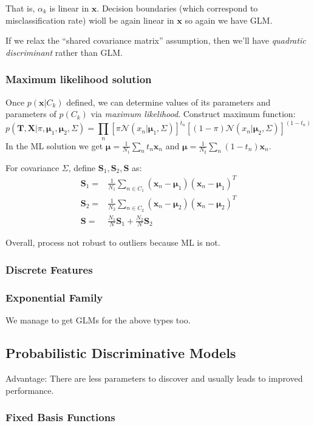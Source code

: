 \documentclass[a4paper]{article}
\newcommand{\mb}{\mathbf}
\newcommand{\bs}{\boldsymbol}
\begin{document}
That is, $\alpha_k$ is linear in $\mb{x}$. Decision boundaries (which correspond to misclassification rate) wioll be again linear in $\mb{x}$ so again we have GLM.

If we relax the ``shared covariance matrix'' assumption, then we'll have \textit{quadratic discriminant} rather than GLM.

\subsubsection{Maximum likelihood solution}
Once $p(\mb{x}|C_k)$ defined, we can determine values of its parameters and parameters of $p(C_k)$ via \textit{maximum likelihood}. Construct maximum function:
%
\begin{equation}
p(\mb{T,X} | \pi, \bs{\mu}_1, \bs{\mu}_2, \Sigma) = \prod\limits_n [\pi \mathcal{N}(x_n|\bs{\mu}_1, \Sigma)]^{t_n} [(1-\pi) \mathcal{N}(x_n|\bs{\mu}_2, \Sigma)]^{(1-t_n)}
\end{equation}
In the ML solution we get $\bs{\mu} = \frac{1}{N_1}\sum\limits_{n} t_n \mb{x}_n$ and $\bs{\mu} = \frac{1}{N_2}\sum\limits_{n} (1-t_n) \mb{x}_n$.

For covariance $\Sigma$, define $\mb{S}_1,\mb{S}_2, \mb{S}$ as:
%
\begin{align}
\mb{S}_1=&\frac{1}{N_1}\sum\limits_{n\in C_1}(\mb{x}_n-\bs{\mu}_1)(\mb{x}_n-\bs{\mu}_1)^T\\
\mb{S}_2=&\frac{1}{N_2}\sum\limits_{n\in C_2}(\mb{x}_n-\bs{\mu}_2)(\mb{x}_n-\bs{\mu}_2)^T\\
\mb{S}=&\frac{N_1}{N}\mb{S}_1+\frac{N_2}{N}\mb{S}_2
\end{align}

Overall, process not robust to outliers because ML is not. 

\subsubsection{Discrete Features}
\subsubsection{Exponential Family}
We manage to get GLMs for the above types too.
\subsection{Probabilistic Discriminative Models}
Advantage: There are less parameters to discover and usually leads to improved performance. 
\subsubsection{Fixed Basis Functions}
\end{document}
